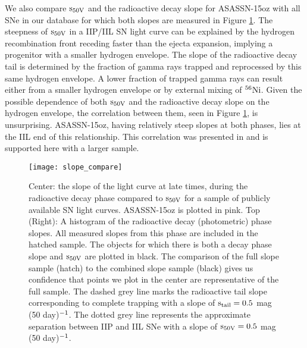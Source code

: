 \documentclass[a4paper,fleqn,usenatbib]{mnras}
\begin{document}
We also compare $\rm{s_{50V}}$ and the radioactive decay slope  for ASASSN-15oz with all SNe in our database for which both slopes are measured in Figure \ref{fig:SlopeComp}.
The steepness of $\rm{s_{50V}}$ in a IIP/IIL SN light curve can be explained by the hydrogen recombination front receding faster than the ejecta expansion, implying a progenitor with a smaller hydrogen envelope.
The slope of the radioactive decay tail is determined by the fraction of gamma rays trapped and reprocessed by this same hydrogen envelope.
A lower fraction of trapped gamma rays can result either from a smaller hydrogen envelope or by external mixing of $\rm{^{56}Ni}$.
Given the possible dependence of both  $\rm{s_{50V}}$  and the radioactive decay slope on the hydrogen envelope, the correlation between them, seen in Figure \ref{fig:SlopeComp}, is unsurprising. 
ASASSN-15oz, having relatively steep slopes at both phases, lies at the IIL end of this relationship.
This correlation was presented in \citet{2014anderson} and is supported here with a larger sample.
\begin{figure}
\begin{center}
\texttt{[image: slope\_compare]} %
\caption{Center: the slope of the light curve at late times, during the radioactive decay phase compared to $\rm{s_{50V}}$ for a sample of publicly available SN light curves.
ASASSN-15oz is plotted in pink.
Top (Right): A histogram of the radioactive decay (photometric) phase slopes. All measured slopes from this phase are included in the hatched sample.
The objects for which there is both a decay phase slope and $\rm{s_{50V}}$  are plotted in black. The comparison of the full slope sample (hatch) to the combined slope sample (black) gives us confidence that points we plot in the center are representative of the full sample. 
The dashed grey line marks the radioactive tail slope corresponding to complete trapping with a slope of $\rm{s_{tail} = 0.5}$ mag (50 day)$\rm{^{-1}}$.
The dotted grey line represents the approximate separation between IIP and IIL SNe with a slope of $\rm{s_{50V}=0.5}$ mag (50 day)$\rm{^{-1}}$. 
 }
\label{fig:SlopeComp}
\end{center}
\end{figure}
\end{document}
